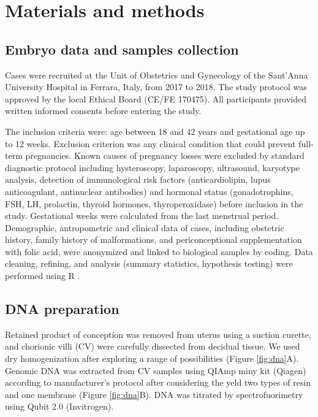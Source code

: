 \section*{Materials and methods}

\subsection*{Embryo data and samples collection}
Cases were recruited at the Unit of Obstetrics and Gynecology of the Sant’Anna University Hospital in Ferrara, Italy, from 2017 to 2018. The study protocol was approved by the local Ethical Board (CE/FE 170475). All participants provided written informed consents before entering the study.

The inclusion criteria were: age between 18 and 42 years and gestational age up to 12 weeks. Exclusion criterion was any clinical condition that could prevent full-term pregnancies. Known causes of pregnancy losses were excluded by standard diagnostic protocol including hysteroscopy, laparoscopy, ultrasound, karyotype analysis, detection of immunological risk factors (anticardiolipin, lupus anticoagulant, antinuclear antibodies) and hormonal status (gonadotrophins, FSH, LH, prolactin, thyroid hormones, thyroperoxidase) before inclusion in the study. Gestational weeks were calculated from the last menstrual period. Demographic, antropometric and clinical data of cases, including obstetric history, family history of malformations, and periconceptional supplementation with folic acid, were anonymized and linked to biological samples by coding. Data cleaning, refining, and analysis (summary statistics, hypothesis testing) were performed using R \cite{R}.


\subsection*{DNA preparation} 
Retained product of conception was removed from uterus using a suction curette, and chorionic villi (CV) were carefully dissected from decidual tissue. We used dry homogenization after exploring a range of possibilities (Figure \ref{fig:dna}A). 
Genomic DNA was extracted from CV samples using QIAmp miny kit (Qiagen) according to manufacturer’s protocol after considering the yeld two types of resin and one membrane (Figure \ref{fig:dna}B). DNA was titrated by spectrofuorimetry using Qubit 2.0 (Invitrogen).



